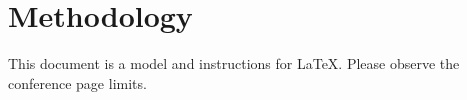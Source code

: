 \section{Methodology}
This document is a model and instructions for \LaTeX.
Please observe the conference page limits. 
